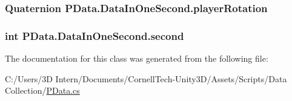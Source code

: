 \subsubsection[{\texorpdfstring{player\+Rotation}{playerRotation}}]{\setlength{\rightskip}{0pt plus 5cm}Quaternion P\+Data.\+Data\+In\+One\+Second.\+player\+Rotation}\hypertarget{class_p_data_1_1_data_in_one_second_ac1604f4086193d1e50d1ab6e44d0d47f}{}\label{class_p_data_1_1_data_in_one_second_ac1604f4086193d1e50d1ab6e44d0d47f}
\subsubsection[{\texorpdfstring{second}{second}}]{\setlength{\rightskip}{0pt plus 5cm}int P\+Data.\+Data\+In\+One\+Second.\+second}\hypertarget{class_p_data_1_1_data_in_one_second_a22285d27875a943a8251a64f0cf10f82}{}\label{class_p_data_1_1_data_in_one_second_a22285d27875a943a8251a64f0cf10f82}


The documentation for this class was generated from the following file\+:\begin{DoxyCompactItemize}
\item 
C\+:/\+Users/3\+D Intern/\+Documents/\+Cornell\+Tech-\/\+Unity3\+D/\+Assets/\+Scripts/\+Data Collection/\hyperlink{_p_data_8cs}{P\+Data.\+cs}\end{DoxyCompactItemize}
